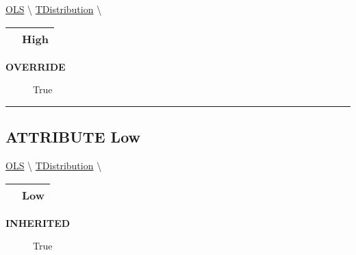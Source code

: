 \hypertarget{ecldoc:linearregression.ols.tdistribution.high}{}
\hspace{0pt} \hyperlink{ecldoc:linearregression.ols}{OLS} \textbackslash 
\hspace{0pt} \hyperlink{ecldoc:linearregression.ols.tdistribution}{TDistribution} \textbackslash 

{\renewcommand{\arraystretch}{1.5}
\begin{tabularx}{\textwidth}{|>{\raggedright\arraybackslash}l|X|}
\hline
\hspace{0pt}\mytexttt{\color{red} } & \textbf{High} \\
\hline
\end{tabularx}
}

\par

\par
\begin{description}
\item [\colorbox{tagtype}{\color{white} \textbf{\textsf{OVERRIDE}}}] \textbf{\underline{}} True
\end{description}

\rule{\linewidth}{0.5pt}
\subsection*{\textsf{\colorbox{headtoc}{\color{white} ATTRIBUTE}
Low}}

\hypertarget{ecldoc:linearregression.ols.tdistribution.low}{}
\hspace{0pt} \hyperlink{ecldoc:linearregression.ols}{OLS} \textbackslash 
\hspace{0pt} \hyperlink{ecldoc:linearregression.ols.tdistribution}{TDistribution} \textbackslash 

{\renewcommand{\arraystretch}{1.5}
\begin{tabularx}{\textwidth}{|>{\raggedright\arraybackslash}l|X|}
\hline
\hspace{0pt}\mytexttt{\color{red} } & \textbf{Low} \\
\hline
\end{tabularx}
}

\par

\par
\begin{description}
\item [\colorbox{tagtype}{\color{white} \textbf{\textsf{INHERITED}}}] \textbf{\underline{}} True
\end{description}


